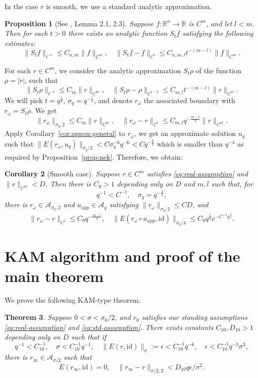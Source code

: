 \documentclass[12pt,reqno]{amsart}
\newtheorem{thm}{Theorem}[section]
\newtheorem{prop}[thm]{Proposition}
\newtheorem{cor}[thm]{Corollary}
\theoremstyle{remark}
\begin{document}
In the case $r$ is smooth, we use a standard analytic approximation. 
\begin{prop}
[See \cite{Zeh1975}, Lemma 2.1, 2.3]
Suppose $f: {\mathbb{R}}^n \to {\mathbb{R}}$ is $C^m$, and let $l < m$. Then for each $t> 0$ there exists an analytic function $S_t f$ satisfying the following estimates:
\[
	\|S_t f\|_{t^{-1}} \le C_{n, m} \|f\|_{C^m}, \quad
	\|S_t f - f\|_{C^l} \le C_{n, m, l} t^{-(m - l)} \|f\|_{C^m}. 
\]
\end{prop}

For each $r \in C^m$, we consider the analytic approximation $S_t \rho$ of the function $\rho = |\ddot{r}|$, such that 
\[
	\|S_t \rho\|_{t^{-1}} \le C_m \|r\|_{C^m}, \quad \|S_t \rho - \rho\|_{C^{l-2}} \le C_{m, l} t^{-(m - l)} \|r\|_{C^m}. 
\]
We will pick $t = q^{\frac14}$, $\sigma_q = q^{-\frac14}$, and denote $r_\omega$ the associated boundary with $\ddot{r}_\omega = S_t \rho$. We get 
\[
	\|r_\omega\|_{\sigma_q, 2} \le C_m \|r\|_{C^m}, \quad \|r_\omega - r\|_{C^{l}} \le C_{m, l} q^{-\frac{m-l}{4}} \|r\|_{C^m}. 
\]
Apply Corollary~\ref{cor:appox-general} to $r_\omega$, we get an approximate solution $u_q$ such that $\|E(r_\omega, u_q)\|_{\sigma_q/2} < C \sigma_q^{-6} q^{-6} < C q^{-\frac{9}2}$ which is smaller than $q^{-4}$ as required by Proposition~\ref{prop:nek}. Therefore, we obtain:
\begin{cor} 
[Smooth case] \label{cor:app-smooth}
Suppose $r \in C^m$ satisfies \eqref{eq:real-assumption} and $\|r\|_{C^m} < D$. Then there is $C_9> 1$ depending only on $D$ and $m, l$ such that, for 
\[
	q^{-1} < C^{-1}, \quad \sigma_q = q^{-\frac14}, 
\]
there is $r_\omega \in {\mathcal{A}}_{\sigma_q, 2}$ and $u_{\mathrm{app}} \in {\mathcal{A}}_q$ satisfying $\|r_\omega\|_{\sigma_q, 2} \le CD$, and 
\[
	\|r_\omega - r\|_{C^l} \le C_9 q^{-\frac{m-l}{4}}, \quad
	\|E(r_\omega \circ u_{\mathrm{app}}, {\mathrm{id}})\|_{\sigma_q/4} \le C_9 q^{\frac14} e^{-  C^{-1} q^{\frac34}}. 
\]
\end{cor}

\section{KAM algorithm and proof of the main theorem}
\label{sec:kam}

We prove the following KAM-type theorem. 
\begin{thm}\label{thm:analytic-KAM}
Suppose $0 < \sigma < \sigma_0/2$, and $r_0$ satisfies our standing assumptions \eqref{eq:real-assumption} and  \eqref{eq:std-assumption}. There exists constants $C_{10}, D_{10} > 1$ depending only on $D$ such that if 
\[
	q^{-1} < C_{10}^{-1}, \quad \sigma < C_{10}^{-1} q^{-1}, \quad \|E(r, {\mathrm{id}})\|_\sigma :=  \epsilon < C_{10}^{-1} q^{-6}, \quad  \epsilon <  C_{10}^{-1} q^{-3} \sigma^3, 
\] 
 there is $r_\infty \in {\mathcal{A}}_{\sigma/2}$ such that 
\[
	E(r_\infty, {\mathrm{id}}) = 0, \quad \|r_\infty - r\|_{\sigma/2, 2} < D_{10} q\epsilon/\sigma^2. 
\]
\end{thm}
\end{document}
